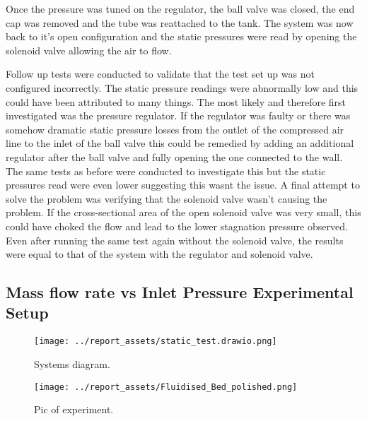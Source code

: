 Once the pressure was tuned on the regulator, the ball valve was closed, the end cap was removed and the tube was reattached to the tank. The system was now back to it's open configuration and the static pressures were read by opening the solenoid valve allowing the air to flow.

Follow up tests were conducted to validate that the test set up was not configured incorrectly. The static pressure readings were abnormally low and this could have been attributed to many things. The most likely and therefore first investigated was the pressure regulator. If the regulator was faulty or there was somehow dramatic static pressure losses from the outlet of the compressed air line to the inlet of the ball valve this could be remedied by adding an additional regulator after the ball valve and fully opening the one connected to the wall.
The same tests as before were conducted to investigate this but the static pressures read were even lower suggesting this wasnt the issue.
A final attempt to solve the problem was verifying that the solenoid valve wasn't causing the problem. If the cross-sectional area of the open solenoid valve was very small, this could have choked the flow and lead to the lower stagnation pressure observed. Even after running the same test again without the solenoid valve, the results were equal to that of the system with the regulator and solenoid valve.

\subsection{Mass flow rate vs Inlet Pressure Experimental Setup}

\begin{figure}[htbp]
    \centering

    \begin{minipage}{0.95\textwidth}
        \centering
        \texttt{[image: ../report\_assets/static\_test.drawio.png]}
        \caption{Systems diagram.}\label{fig:systems-diagram}
    \end{minipage}
    \begin{minipage}{0.45\textwidth}
        \centering
        \texttt{[image: ../report\_assets/Fluidised\_Bed\_polished.png]}
        \caption{Pic of experiment.}\label{fig:experiment-image}
    \end{minipage}

\end{figure}

